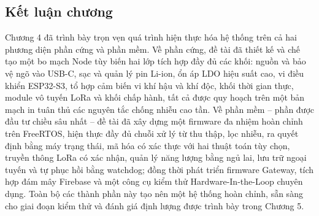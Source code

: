 \subsection{Kết luận chương}
Chương 4 đã trình bày trọn vẹn quá trình hiện thực hóa hệ thống trên cả hai phương diện phần cứng và phần mềm. Về phần cứng, đề tài đã thiết kế và chế tạo một bo mạch Node tùy biến hai lớp tích hợp đầy đủ các khối: nguồn và bảo vệ ngõ vào USB-C, sạc và quản lý pin Li-ion, ổn áp LDO hiệu suất cao, vi điều khiển ESP32-S3, tổ hợp cảm biến vi khí hậu và khí độc, khối thời gian thực, module vô tuyến LoRa và khối chấp hành, tất cả được quy hoạch trên một bản mạch in tuân thủ các nguyên tắc chống nhiễu cao tần. Về phần mềm -- phần được đầu tư chiều sâu nhất -- đề tài đã xây dựng một firmware đa nhiệm hoàn chỉnh trên FreeRTOS, hiện thực đầy đủ chuỗi xử lý từ thu thập, lọc nhiễu, ra quyết định bằng máy trạng thái, mã hóa có xác thực với hai thuật toán tùy chọn, truyền thông LoRa có xác nhận, quản lý năng lượng bằng ngủ lai, lưu trữ ngoại tuyến và tự phục hồi bằng watchdog; đồng thời phát triển firmware Gateway, tích hợp đám mây Firebase và một công cụ kiểm thử Hardware-In-the-Loop chuyên dụng. Toàn bộ các thành phần này tạo nên một hệ thống hoàn chỉnh, sẵn sàng cho giai đoạn kiểm thử và đánh giá định lượng được trình bày trong Chương 5.
